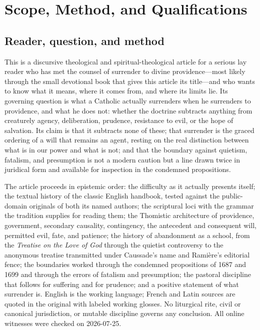 \section{Scope, Method, and Qualifications}

\subsection{Reader, question, and method}

This is a discursive theological and spiritual-theological article for a serious lay reader who has met the counsel of surrender to divine providence---most likely through the small devotional book that gives this article its title---and who wants to know what it means, where it comes from, and where its limits lie. Its governing question is what a Catholic actually surrenders when he surrenders to providence, and what he does not: whether the doctrine subtracts anything from creaturely agency, deliberation, prudence, resistance to evil, or the hope of salvation. Its claim is that it subtracts none of these; that surrender is the graced ordering of a will that remains an agent, resting on the real distinction between what is in our power and what is not; and that the boundary against quietism, fatalism, and presumption is not a modern caution but a line drawn twice in juridical form and available for inspection in the condemned propositions.

The article proceeds in epistemic order: the difficulty as it actually presents itself; the textual history of the classic English handbook, tested against the public-domain originals of both its named authors; the scriptural loci with the grammar the tradition supplies for reading them; the Thomistic architecture of providence, government, secondary causality, contingency, the antecedent and consequent will, permitted evil, fate, and patience; the history of abandonment as a school, from the \emph{Treatise on the Love of God} through the quietist controversy to the anonymous treatise transmitted under Caussade's name and Ramière's editorial fence; the boundaries worked through the condemned propositions of 1687 and 1699 and through the errors of fatalism and presumption; the pastoral discipline that follows for suffering and for prudence; and a positive statement of what surrender is. English is the working language; French and Latin sources are quoted in the original with labeled working glosses. No liturgical rite, civil or canonical jurisdiction, or mutable discipline governs any conclusion. All online witnesses were checked on 2026-07-25.

